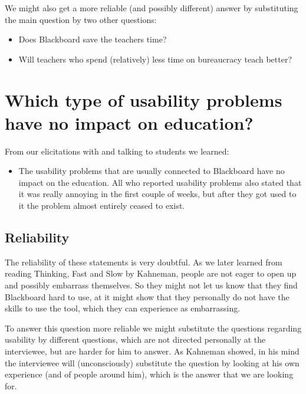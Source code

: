 We might also get a more reliable (and possibly different) answer by substituting the main question by two other questions:
\begin{itemize}
	\item Does Blackboard save the teachers time?
	\item Will teachers who spend (relatively) less time on bureaucracy teach better?
\end{itemize}


\section{Which type of usability problems have no impact on education?}
From our elicitations with and talking to students we learned:
\begin{itemize}
	\item The usability problems that are usually connected to Blackboard have no impact on the	education. All who reported usability problems also stated that it was really annoying in the first couple of weeks, but after they got used to it the problem almost	entirely ceased to exist.
\end{itemize}

\subsection{Reliability}
The reliability of these statements is very doubtful. As we later learned from reading Thinking, Fast and Slow by Kahneman, people are not eager to open up and possibly embarrass themselves. So they might not let us know that they find Blackboard hard to use, at it might show that they personally do not have the skills to use the tool, which they can experience as embarrassing.

To answer this question more reliable we might substitute the questions regarding usability by different questions, which are not directed personally at the interviewee, but are harder for him to answer. As Kahneman showed, in his mind the interviewee will (unconsciously) substitute the question by looking at his own experience (and of people around him), which is the answer that we are looking for. 


